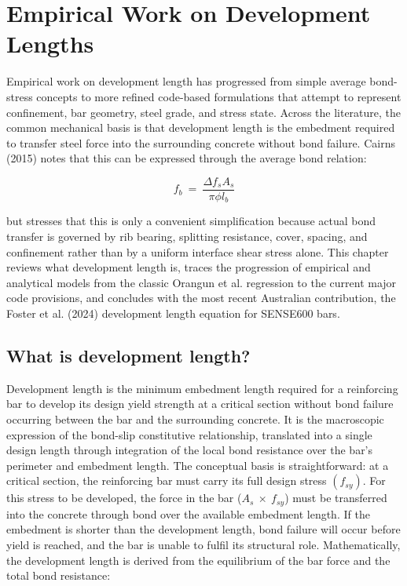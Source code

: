 \section{Empirical Work on Development Lengths}
Empirical work on development length has progressed from simple average bond-stress concepts to more refined code-based formulations that attempt to represent confinement, bar geometry, steel grade, and stress state. Across the literature, the common mechanical basis is that development length is the embedment required to transfer steel force into the surrounding concrete without bond failure. Cairns (2015) notes that this can be expressed through the average bond relation:

\begin{equation}
    f_{b}\ =\ \frac{\Delta f_{s}A_{s}}{\pi \phi l_{b}}
\end{equation}

but stresses that this is only a convenient simplification because actual bond transfer is governed by rib bearing, splitting resistance, cover, spacing, and confinement rather than by a uniform interface shear stress alone. This chapter reviews what development length is, traces the progression of empirical and analytical models from the classic Orangun et al. regression to the current major code provisions, and concludes with the most recent Australian contribution, the Foster et al. (2024) development length equation for SENSE600 bars.

\subsection{What is development length?}

Development length is the minimum embedment length required for a reinforcing bar to develop its design yield strength at a critical section without bond failure occurring between the bar and the surrounding concrete. It is the macroscopic expression of the bond-slip constitutive relationship, translated into a single design length through integration of the local bond resistance over the bar's perimeter and embedment length.
The conceptual basis is straightforward: at a critical section, the reinforcing bar must carry its full design stress $\left(f_{sy}\right)$. For this stress to be developed, the force in the bar ($A_{s}\ \times \ f_{sy}$) must be transferred into the concrete through bond over the available embedment length. If the embedment is shorter than the development length, bond failure will occur before yield is reached, and the bar is unable to fulfil its structural role. Mathematically, the development length is derived from the equilibrium of the bar force and the total bond resistance:

